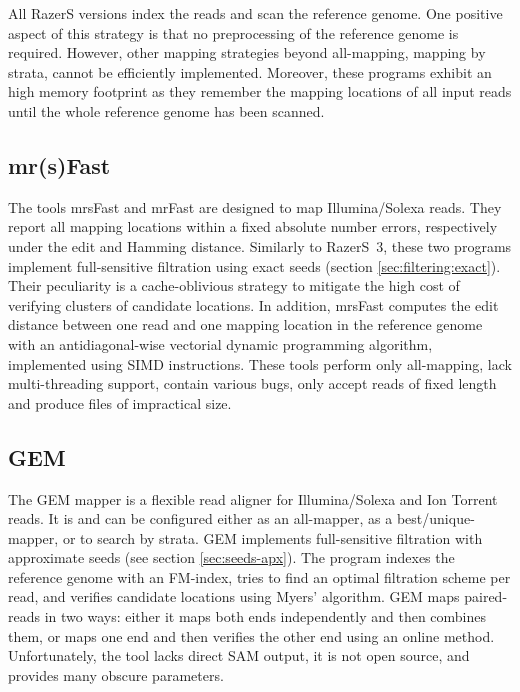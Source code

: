 All RazerS versions index the reads and scan the reference genome.
One positive aspect of this strategy is that no preprocessing of the reference genome is required.
However, other mapping strategies beyond all-mapping, \eg mapping by strata, cannot be efficiently implemented.
Moreover, these programs exhibit an high memory footprint as they remember the mapping locations of all input reads until the whole reference genome has been scanned.


\subsection{mr(s)Fast}
\label{background:mappers:mrsfast}

The tools mrsFast \citep{Hach2010} and mrFast \citep{Ahmadi2012} are designed to map Illumina/Solexa reads.
They report all mapping locations within a fixed absolute number errors, respectively under the edit and Hamming distance.
Similarly to RazerS~3, these two programs implement full-sensitive filtration using exact seeds (section \ref{sec:filtering:exact}).
Their peculiarity is a cache-oblivious strategy to mitigate the high cost of verifying clusters of candidate locations.
In addition, mrsFast computes the edit distance between one read and one mapping location in the reference genome with an antidiagonal-wise vectorial dynamic programming algorithm, implemented using SIMD instructions.
These tools perform only all-mapping, lack multi-threading support, contain various bugs, only accept reads of fixed length and produce files of impractical size.


\subsection{GEM}
\label{background:mappers:gem}

The GEM mapper \citep{MarcoSola2012} is a flexible read aligner for Illumina/Solexa and Ion Torrent reads.
It is  and can be configured either as an all-mapper, as a best/unique-mapper, or to search by strata.
GEM implements full-sensitive filtration with approximate seeds (see section \ref{sec:seeds-apx}).
The program indexes the reference genome with an FM-index, tries to find an optimal filtration scheme per read, and verifies candidate locations using Myers' algorithm.
GEM maps paired-reads in two ways: either it maps both ends independently and then combines them, or maps one end and then verifies the other end using an online method.
Unfortunately, the tool lacks direct SAM output, it is not open source, and provides many obscure parameters.

